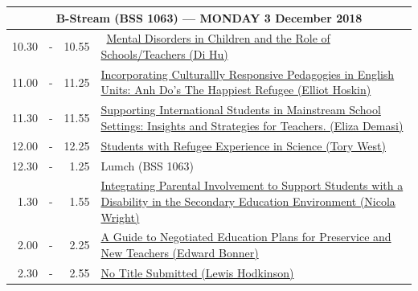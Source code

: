 \documentclass[twoside,12pt,a4paper,notitlepage]{memoir}
\begin{document}
\begin{center}
\begin{tabular}{rcr|p{10.8cm}}
\multicolumn{4}{c}{{\large B-Stream (BSS 1063) --- MONDAY 3 December 2018}} \\ \hline
 10.30 & - & 10.55 & 
\ \hyperref[aut:hu]{Mental Disorders in Children and the Role of Schools/Teachers (Di Hu)} \\ \hline
11.00 & - & 11.25 &
 \hyperref[aut:hoskin]{Incorporating Culturallly Responsive Pedagogies in English Units: Anh Do's The Happiest Refugee (Elliot Hoskin)} \\ \hline
11.30 & - & 11.55 &
 \hyperref[aut:demasi]{Supporting International Students in Mainstream School Settings: Insights and Strategies for Teachers. (Eliza Demasi)} \\ \hline
12.00 & - & 12.25 &
 \hyperref[aut:west]{Students with Refugee Experience in Science (Tory West)} \\ \hline
12.30 & - & 1.25 & Lumch (BSS 1063) \\ \hline
1.30 & - & 1.55 &
 \hyperref[aut:wright]{Integrating Parental Involvement to Support Students with a Disability in the Secondary Education Environment (Nicola Wright)} \\ \hline
2.00 & - & 2.25 &
 \hyperref[aut:bonner]{A Guide to Negotiated Education Plans for Preservice and New Teachers (Edward Bonner)} \\ \hline
2.30 & - & 2.55 &
 \hyperref[aut:hodkinson]{No Title Submitted (Lewis Hodkinson)} \\ \hline
\end{tabular}
\end{center}
\end{document}
